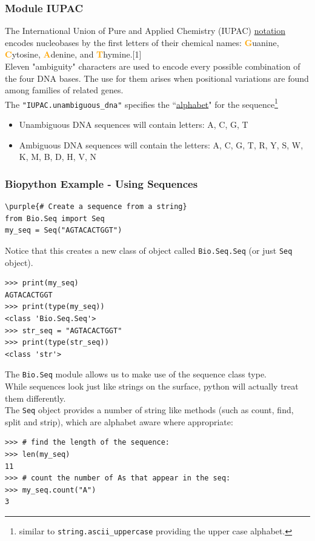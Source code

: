 \documentclass[xcolor=svgnames]{beamer}
\newcommand{\purple}[1]{{\textcolor{purple}{#1}}}
\newcommand{\nl}{\\[1em]}
\newcommand{\define}[1]{\textbf{\textcolor{orange}{#1}}}
\newcommand{\ft}[1]{\frametitle{#1}}
\begin{document}
\begin{frame}[fragile]\ft{Module IUPAC}
The International Union of Pure and Applied Chemistry (IUPAC)
\href{https://www.bioinformatics.org/sms/iupac.html}{notation} encodes nucleobases  by the first letters of their chemical names: \define Guanine,  \define Cytosine, \define Adenine, and \define Thymine.[1]\nl

Eleven "ambiguity" characters are used to encode every possible combination of the four DNA bases.  The use for them arises when  positional variations are found among families of related genes.\nl

The \verb|"IUPAC.unambiguous_dna"| specifies the ``\href{http://biopython.org/DIST/docs/api/Bio.Alphabet.IUPAC-module.html}{alphabet}" for the sequence\footnote{similar to {\tt string.ascii\_uppercase} providing the upper case alphabet.}
\begin{itemize}
\item Unambiguous DNA sequences will contain letters: A, C, G, T
\item Ambiguous DNA sequences will contain the letters: A, C, G, T,  R, Y, S, W, K, M, B, D, H, V, N
\end{itemize}
\end{frame}


\begin{frame}[fragile]\ft{Biopython Example - Using Sequences}
\begin{Verbatim}[commandchars=\\\{\}]
\purple{# Create a sequence from a string}
from Bio.Seq import Seq
my_seq = Seq("AGTACACTGGT")
\end{Verbatim}
Notice that this creates a new class of object called {\tt Bio.Seq.Seq} (or just {\tt Seq} object).
\begin{Verbatim}[frame=single]
>>> print(my_seq)
AGTACACTGGT
>>> print(type(my_seq))
<class 'Bio.Seq.Seq'>
>>> str_seq = "AGTACACTGGT"
>>> print(type(str_seq))
<class 'str'>
\end{Verbatim}


\end{frame}





\begin{frame}[fragile]
 The {\tt Bio.Seq} module allows us to make use of the sequence class type. \nl
 While sequences look just like strings on the surface, python will actually treat them differently.\nl
The {\tt Seq} object provides a number of string like methods (such as count, find, split and strip), which are alphabet aware where appropriate:
\begin{Verbatim}[frame=single]
>>> # find the length of the sequence:
>>> len(my_seq)
11
>>> # count the number of As that appear in the seq:
>>> my_seq.count("A")
3
\end{Verbatim}

\end{frame}
\end{document}
